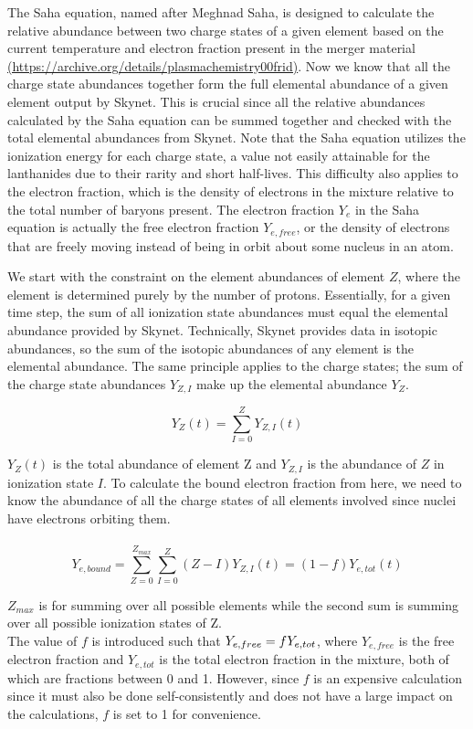 \documentclass[11pt,a4paper]{article}
\begin{document}
\hspace{8mm} The Saha equation, named after Meghnad Saha, is designed to calculate the relative abundance between two charge states of a given element based on the current temperature and electron fraction present in the merger material \url{(https://archive.org/details/plasmachemistry00frid)}. Now we know that all the charge state abundances together form the full elemental abundance of a given element output by Skynet. This is crucial since all the relative abundances calculated by the Saha equation can be summed together and checked with the total elemental abundances from Skynet. Note that the Saha equation utilizes the ionization energy for each charge state, a value not easily attainable for the lanthanides due to their rarity and short half-lives. This difficulty also applies to the electron fraction, which is the density of electrons in the mixture relative to the total number of baryons present. The electron fraction $Y_e$ in the Saha equation is actually the free electron fraction $Y_{e,free}$, or the density of electrons that are freely moving instead of being in orbit about some nucleus in an atom. 

We start with the constraint on the element abundances of element $Z$, where the element is determined purely by the number of protons. Essentially, for a given time step, the sum of all ionization state abundances must equal the elemental abundance provided by Skynet. Technically, Skynet provides data in isotopic abundances, so the sum of the isotopic abundances of any element is the elemental abundance. The same principle applies to the charge states; the sum of the charge state abundances $Y_{Z,I}$ make up the elemental abundance $Y_Z$.

$$Y_Z (t) = \sum_{I=0}^{Z} Y_{Z,I}(t)$$

$Y_Z (t)$ is the total abundance of element Z and $Y_{Z,I}$ is the abundance of $Z$ in ionization state $I$. To calculate the bound electron fraction from here, we need to know the abundance of all the charge states of all elements involved since nuclei have electrons orbiting them. 
\\\\
$$Y_{e,bound} = \sum_{Z=0}^{Z_{max}} \sum_{I=0}^{Z} (Z - I) Y_{Z,I}(t) = (1-f) Y_{e,tot}(t) $$

$Z_{max}$ is for summing over all possible elements while the second sum is summing over all possible ionization states of Z. 
\\The value of $f$ is introduced such that $Y_{e,free} = f \hspace{.1mm} Y_{e,tot}$, where $Y_{e,free}$ is the free electron fraction and $Y_{e,tot}$ is the total electron fraction in the mixture, both of which are fractions between 0 and 1. However, since $f$ is an expensive calculation since it must also be done self-consistently and does not have a large impact on the calculations, $f$ is set to 1 for convenience. \\
\end{document}
